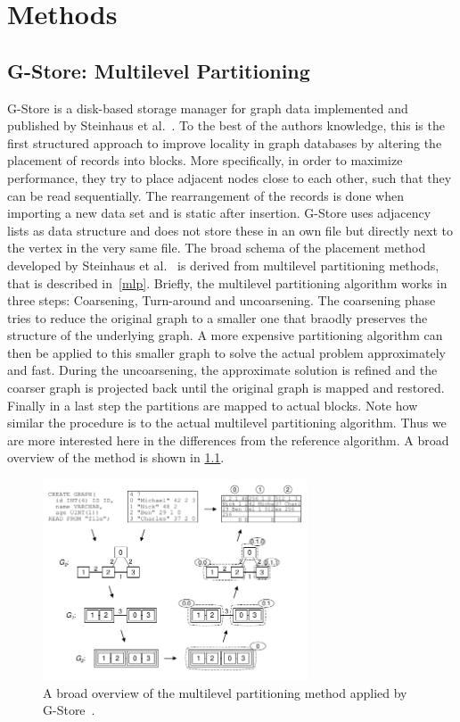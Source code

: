 \chapter{Methods}
\section{G-Store: Multilevel Partitioning}
    G-Store is a disk-based storage manager for graph data implemented and published by Steinhaus et al.~\autocite{steinhaus2010g}. 
    To the best of the authors knowledge, this is the first structured approach to improve locality in graph databases by altering the placement of records into blocks.
    More specifically, in order to maximize performance, they try to place adjacent nodes close to each other, such that they can be read sequentially. 
    The rearrangement of the records is done when importing a new data set and is static after insertion.
    G-Store uses adjacency lists as data structure and does not store these in an own file but directly next to the vertex in the very same file.
    The broad schema of the placement method developed by Steinhaus et al.~\autocite{steinhaus2010g} is derived from multilevel partitioning methods, that is described in~\ref{mlp}.
    Briefly, the multilevel partitioning algorithm works in three steps: Coarsening, Turn-around and uncoarsening. 
    The coarsening phase tries to reduce the original graph to a smaller one that braodly preserves the structure of the underlying graph. 
    A more expensive partitioning algorithm can then be applied to this smaller graph to solve the actual problem approximately and fast.
    During the uncoarsening, the approximate solution is refined and the coarser graph is projected back until the original graph is mapped and restored.
    Finally in a last step the partitions are mapped to actual blocks.
    Note how similar the procedure is to the actual multilevel partitioning algorithm. 
    Thus we are more interested here in the differences from the reference algorithm.
    A broad overview of the method is shown in \ref{g-store}.
    
    \begin{figure}[htp]
        \begin{center}
            \includegraphics[keepaspectratio,width=0.7\textwidth]{img/06-rel_w/g-store.png}
        \end{center}
        \caption{A broad overview of the multilevel partitioning method applied by G-Store~\autocite{steinhaus2010g}.} 
        \label{g-store}
    \end{figure}

